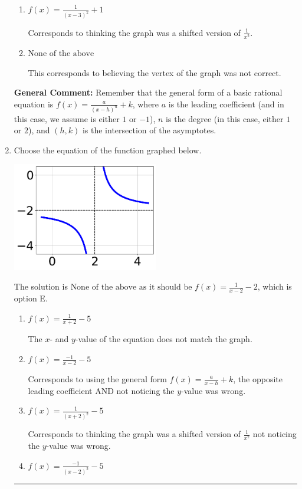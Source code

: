 \documentclass{extbook}[14pt]
\newcommand{\litem}[1]{\item #1

\rule{\textwidth}{0.4pt}}
\begin{document}
\begin{enumerate}
{\begin{enumerate}[label=\Alph*.]
This is the correct option.
\item \( f(x) = \frac{1}{(x - 3)^2} + 1 \)

Corresponds to thinking the graph was a shifted version of $\frac{1}{x^2}$.
\item \( \text{None of the above} \)

This corresponds to believing the vertex of the graph was not correct.
\end{enumerate}

\textbf{General Comment:} Remember that the general form of a basic rational equation is $ f(x) = \frac{a}{(x-h)^n} + k$, where $a$ is the leading coefficient (and in this case, we assume is either $1$ or $-1$), $n$ is the degree (in this case, either $1$ or $2$), and $(h, k)$ is the intersection of the asymptotes.
}
\litem{
Choose the equation of the function graphed below.

\begin{center}
    \includegraphics[width=0.5\textwidth]{../Figures/rationalGraphToEquationCopyC.png}
\end{center}


The solution is \( \text{None of the above as it should be } f(x) = \frac{1}{x - 2} - 2 \), which is option E.\begin{enumerate}[label=\Alph*.]
\item \( f(x) = \frac{1}{x + 2} - 5 \)

The $x$- and $y$-value of the equation does not match the graph.
\item \( f(x) = \frac{-1}{x - 2} - 5 \)

Corresponds to using the general form $f(x) = \frac{a}{x-h}+k$, the opposite leading coefficient AND not noticing the $y$-value was wrong.
\item \( f(x) = \frac{1}{(x + 2)^2} - 5 \)

Corresponds to thinking the graph was a shifted version of $\frac{1}{x^2}$ not noticing the $y$-value was wrong.
\item \( f(x) = \frac{-1}{(x - 2)^2} - 5 \)


\end{enumerate}}
\end{enumerate}
\end{document}
